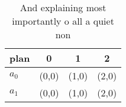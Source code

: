 \documentclass[a4paper]{article}
\begin{document}
\begin{table}
\begin{adjustbox}{width=0.6\columnwidth}
\begin{tabular}{|l|l|l|l|}
\hline
\textbf{plan} & \multicolumn{1}{c|}{\textbf{0}} & \multicolumn{1}{c|}{\textbf{1}} & \multicolumn{1}{c|}{\textbf{2}} \\ \hline
\textbf{$a_0$}  & (0,0) & (1,0) & (2,0) \\ \hline
\textbf{$a_1$}  & (0,0) & (1,0) & (2,0) \\ \hline
\end{tabular}
\end{adjustbox}
\caption{And explaining most importantly o all a quiet non
}
\end{table}
\end{document}
